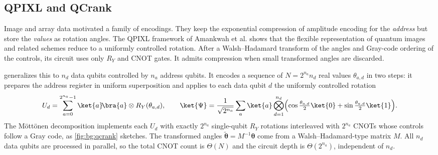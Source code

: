 \subsection{QPIXL and QCrank}

Image and array data motivated a family of encodings. They keep the exponential compression of amplitude encoding for the \emph{address} but store the \emph{values} as rotation angles. The QPIXL framework of Amankwah et al. \cite{amankwah2022qpixl} shows that the flexible representation of quantum images and related schemes reduce to a uniformly controlled rotation. After a Walsh--Hadamard transform of the angles and Gray-code ordering of the controls, its circuit uses only $R_Y$ and CNOT gates. It admits compression when small transformed angles are discarded.

\qcrank{} \cite{balewski2024qcrank} generalizes this to $n_d$ data qubits controlled by $n_a$ address qubits. It encodes a sequence of $N=2^{n_a}n_d$ real values $\theta_{a,d}$ in two steps: it prepares the address register in uniform superposition and applies to each data qubit $d$ the uniformly controlled rotation
\begin{equation}\label{eq:bg:ucr}
U_d=\sum_{a=0}^{2^{n_a}-1}\ket{a}\!\bra{a}\otimes R_Y(\theta_{a,d}),\qquad
\ket{\Psi}=\frac{1}{\sqrt{2^{n_a}}}\sum_{a}\ket{a}\bigotimes_{d=1}^{n_d}\Bigl(\cos\tfrac{\theta_{a,d}}{2}\ket{0}+\sin\tfrac{\theta_{a,d}}{2}\ket{1}\Bigr).
\end{equation}
The M{\"o}tt{\"o}nen decomposition \cite{mottonen2004ucr} implements each $U_d$ with exactly $2^{n_a}$ single-qubit $R_Y$ rotations interleaved with $2^{n_a}$ CNOTs whose controls follow a Gray code, as \cref{fig:bg:qcrank} sketches. The transformed angles $\tilde{\bm{\theta}}=M^{-1}\bm{\theta}$ come from a Walsh--Hadamard-type matrix $M$. All $n_d$ data qubits are processed in parallel, so the total CNOT count is $\Theta(N)$ and the circuit depth is $\Theta(2^{n_a})$, independent of $n_d$.

